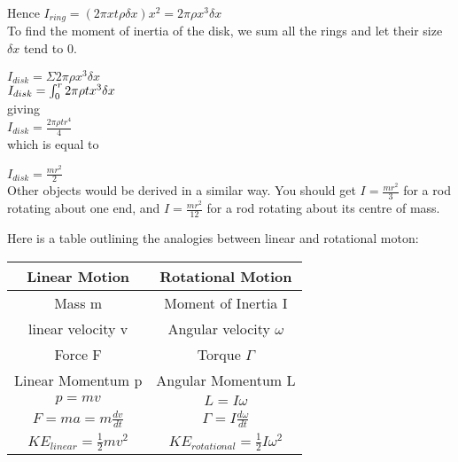 \documentclass[main.tex]{subfiles}
\begin{document}
Hence $I_{ring}= (2\pi x t \rho\delta x )x^2 = 2\pi \rho x^{3} \delta x$
\\

To find the moment of inertia of the disk, we sum all the rings and let their size $\delta x$ tend to 0.


$I_{disk}= \Sigma 2\pi \rho x^{3} \delta x$
\\

$I_{disk}= \int\displaylimits_0^r 2\pi \rho  t x^{3}\delta x $
\\

giving
\\

$I_{disk} = \frac{2\pi\rho t r^4}{4}$
\\

which is equal to

$I_{disk} = \frac{mr^2}{2}$
\\

Other objects would be derived in a similar way. You should get $I=\frac{mr^2}{3}$ for a rod rotating about one end, and $I =\frac{mr^2}{12}$ for a rod rotating about its centre of mass.
\\


Here is a table outlining the analogies between linear and rotational moton:
\\

\begin{center}
	\begin{tabular}{||c c||}
		\hline
		\textbf{Linear Motion} & \textbf{Rotational Motion}\\ [0.5ex]
		\hline\hline
		 Mass m &Moment of Inertia I\\
		\hline
		linear velocity v &Angular velocity $\omega$\\
		\hline
		Force F & Torque $\Gamma$ \\
		\hline
		Linear Momentum p  & Angular Momentum L \\
		\hline
		$p=mv$ & $ L = I\omega$  \\
		\hline
		$F=ma =m\frac{dv}{dt}$ & $\Gamma=I \frac{d\omega}{dt}$ \\
		\hline
		$KE_{linear}=\frac{1}{2}mv^2$ & $KE_{rotational} =\frac{1}{2}I\omega ^2$\\ [1ex]
		\hline
	\end{tabular}
\end{center}
\end{document}
